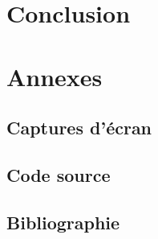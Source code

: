 \documentclass[a4paper,french,12pt]{article}
\begin{document}
\section{Conclusion}



\section{Annexes}
	
	\subsection{Captures d'écran}
		\newpage
	
	\subsection{Code source}
	
	
	\subsection{Bibliographie}
	

		
\end{document}
